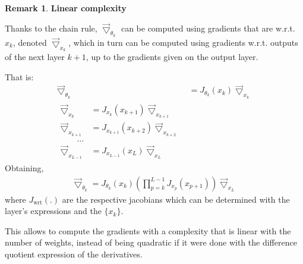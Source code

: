 \documentclass{article}
\theoremstyle{definition}
\newtheorem{remark}{Remark}
\newcommand{\ovec}{}
\begin{document}
\begin{remark}\textbf{Linear complexity}\\
{Thanks to the chain rule, $\vec{\bigtriangledown}_{\theta_k}$ can be computed using gradients that are w.r.t. $\ovec{x_k}$, denoted $\vec{\bigtriangledown}_{x_k}$, which in turn can be computed using gradients w.r.t. outputs of the next layer $k+1$, up to the gradients given on the output layer.

That is:
\begin{align}
  \vec{\bigtriangledown}_{\theta_k} & = J_{\theta_k}(\ovec{x_k}) \vec{\bigtriangledown}_{x_k} \\
  \begin{split}
  \vec{\bigtriangledown}_{x_k} & = J_{x_k}(\ovec{x_{k+1}}) \vec{\bigtriangledown}_{x_{k+1}} \\
  \vec{\bigtriangledown}_{x_{k+1}} & = J_{x_{k+1}}(\ovec{x_{k+2}}) \vec{\bigtriangledown}_{x_{k+2}} \\
  \quad \quad \ldots\\
  \vec{\bigtriangledown}_{x_{L-1}} & = J_{x_{L-1}}(\ovec{x_{L}}) \vec{\bigtriangledown}_{x_{L}}
  \label{eq:bp}
  \end{split}
\end{align}
Obtaining,
\begin{align}
  \vec{\bigtriangledown}_{\theta_k} = J_{\theta_k}(\ovec{x_k}) (\prod_{p=k}^{L-1} J_{x_p}(\ovec{x_{p+1}})) \vec{\bigtriangledown}_{x_L}
\end{align}
where $J_{\text{wrt}}(.)$ are the respective jacobians which can be determined with the layer's expressions and the $\{x_k\}$.

This allows to compute the gradients with a complexity that is linear with the number of weights, instead of being quadratic if it were done with the difference quotient expression of the derivatives.}
\end{remark}
\end{document}
